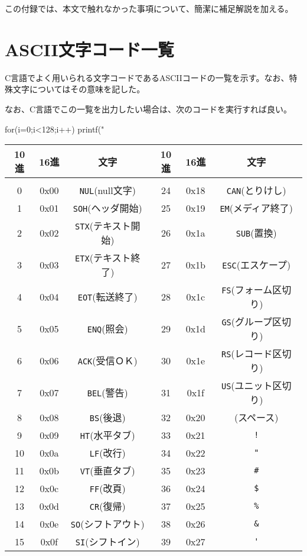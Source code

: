 この付録では、本文で触れなかった事項について、簡潔に補足解説を加える。

\section{ASCII文字コード一覧}
C言語でよく用いられる文字コードであるASCIIコードの一覧を示す。なお、特殊文字についてはその意味を記した。

なお、C言語でこの一覧を出力したい場合は、次のコードを実行すれば良い。
\begin{code}
for(i=0;i<128;i++) printf("%
\end{code}


\begin{center}
\begin{tabular}{|c|c|c||c|c|c|}\hline
10進&16進&文字&10進&16進&文字 \\ \hline
 & & & & & \\[-15pt] \hline
0&0x00&\verb|NUL|(null文字)&24&0x18&\verb|CAN|(とりけし)\\ \hline
1&0x01&\verb|SOH|(ヘッダ開始)&25&0x19&\verb|EM|(メディア終了)\\ \hline
2&0x02&\verb|STX|(テキスト開始)&26&0x1a&\verb|SUB|(置換)\\ \hline
3&0x03&\verb|ETX|(テキスト終了)&27&0x1b&\verb|ESC|(エスケープ)\\ \hline
4&0x04&\verb|EOT|(転送終了)&28&0x1c&\verb|FS|(フォーム区切り)\\ \hline
5&0x05&\verb|ENQ|(照会)&29&0x1d&\verb|GS|(グループ区切り)\\ \hline
6&0x06&\verb|ACK|(受信ＯＫ)&30&0x1e&\verb|RS|(レコード区切り)\\ \hline
7&0x07&\verb|BEL|(警告)&31&0x1f&\verb|US|(ユニット区切り)\\ \hline
8&0x08&\verb|BS|(後退)&32&0x20&\verb``(スペース)\\ \hline
9&0x09&\verb|HT|(水平タブ)&33&0x21&\verb|!|\\ \hline
10&0x0a&\verb|LF|(改行)&34&0x22&\verb|"|\\ \hline
11&0x0b&\verb|VT|(垂直タブ)&35&0x23&\verb|#|\\ \hline
12&0x0c&\verb|FF|(改頁)&36&0x24&\verb|$|\\ \hline
13&0x0d&\verb|CR|(復帰)&37&0x25&\verb|%|\\ \hline
14&0x0e&\verb|SO|(シフトアウト)&38&0x26&\verb|&|\\ \hline
15&0x0f&\verb|SI|(シフトイン)&39&0x27&\verb|'|\\ \hline

\end{tabular}
\end{center}
